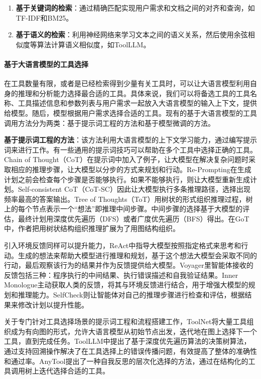 \begin{enumerate}
    \item \textbf{基于关键词的检索}：通过精确匹配实现用户需求和文档之间的对齐和查询，如TF-IDF\cite{Jones1972}和BM25\cite{Robertson2009}。
    \item \textbf{基于语义的检索}：利用神经网络来学习文本之间的语义关系，然后使用余弦相似度等算法计算语义相似度，如ToolLLM\cite{Qin2023}。
\end{enumerate}

\paragraph{基于大语言模型的工具选择} 

在工具数量有限，或者是已经检索得到少量有关工具时，可以让大语言模型利用自身的推理和分析能力选择最合适的工具。具体来说，我们可以将备选工具的工具名称、工具描述信息和参数列表与用户需求一起放入大语言模型的输入上下文，提供给模型。随后，模型根据用户需求选择合适的工具。现有的基于大语言模型的工具调用方法分为两类：基于提示词工程的方法和基于模型微调的方法。

\textbf{基于提示词工程的方法}：该方法利用大语言模型的上下文学习能力，通过编写提示词来进行工作。有一些通用的提示词技巧可以帮助在多个工具中选择正确的工具。Chain of Thought（CoT）\cite{Wang2023a}在提示词中加入了例子，让大模型在解决复杂问题时采取相应的推理步骤，让大模型以分步的方式来规划和行动。Re-Prompting\cite{Raman2022}在生成计划之前会检查每个步骤是否能够执行。如果不能够执行，则让大模型重新生成计划。Self-consistent CoT（CoT-SC）\cite{wang2022self}因此让大模型执行多条推理路径，选择出现频率最高的答案输出。Tree of Thoughts（ToT）\cite{Yao2023a}用树状的形式组织推理过程，树上的每个节点表示一个“想法”即推理中间步骤。中间步骤的选择基于大模型的评估，最终计划用深度优先遍历（DFS）或者广度优先遍历（BFS）得出。在GoT\cite{Besta2023}中，作者把用树状结构组织推理扩展为了用图结构组织。

引入环境反馈同样可以提升能力，ReAct\cite{Yao2023b}中指导大模型按照指定格式来思考和行动。生成的想法来帮助大模型进行推理和规划，基于这个想法大模型会采取不同的行动，最后观察该行为的结果并作为反馈提供给大模型。Voyager\cite{Wang2023b}里智能体接收的反馈包括三种：程序执行的中间结果、执行错误描述和自我验证结果。Inner Monologue\cite{Huang2022}主动获取人类的反馈，将其与环境反馈进行结合，用于增强大模型的规划和推理能力。SelfCheck\cite{Miao2023}则让智能体对自己的推理步骤进行检查和评估，根据结果来修改计划以提升性能。

关于专门针对工具选择场景的提示词工程和流程搭建工作，ToolNet\cite{Liu2024}将大量工具组织成为有向图的形式，允许大语言模型从初始节点出发，迭代地在图上选择下一个工具，直到完成任务。ToolLLM\cite{Qin2023}中提出了基于深度优先遍历算法的决策树算法，通过支持回溯操作解决了在工具选择上的错误传播问题，有效提高了整体的准确性和通过率。AnyTool\cite{Du2024}提出了一种自我反思的层次化选择的方法，通过在结构化的工具调用树上迭代选择合适的工具。

